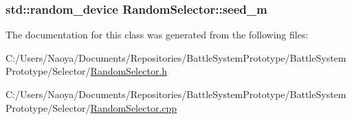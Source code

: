 \subsubsection[{seed\+\_\+m}]{\setlength{\rightskip}{0pt plus 5cm}std\+::random\+\_\+device Random\+Selector\+::seed\+\_\+m}\label{class_random_selector_a0d02d545b4b26df31510b9ab238bbc0c}


The documentation for this class was generated from the following files\+:\begin{DoxyCompactItemize}
\item 
C\+:/\+Users/\+Naoya/\+Documents/\+Repositories/\+Battle\+System\+Prototype/\+Battle\+System\+Prototype/\+Selector/\hyperlink{_random_selector_8h}{Random\+Selector.\+h}\item 
C\+:/\+Users/\+Naoya/\+Documents/\+Repositories/\+Battle\+System\+Prototype/\+Battle\+System\+Prototype/\+Selector/\hyperlink{_random_selector_8cpp}{Random\+Selector.\+cpp}\end{DoxyCompactItemize}
